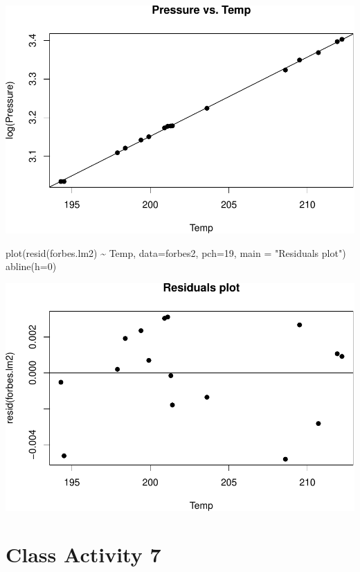 \documentclass[
]{book}
\newenvironment{Shaded}{\begin{snugshade}}{\end{snugshade}}
\newcommand{\AttributeTok}[1]{\textcolor[rgb]{0.77,0.63,0.00}{#1}}
\newcommand{\DecValTok}[1]{\textcolor[rgb]{0.00,0.00,0.81}{#1}}
\newcommand{\FunctionTok}[1]{\textcolor[rgb]{0.00,0.00,0.00}{#1}}
\newcommand{\NormalTok}[1]{#1}
\newcommand{\SpecialCharTok}[1]{\textcolor[rgb]{0.00,0.00,0.00}{#1}}
\newcommand{\StringTok}[1]{\textcolor[rgb]{0.31,0.60,0.02}{#1}}
\begin{document}
\includegraphics[width=1\linewidth]{Class_Activity_6_files/figure-latex/unnamed-chunk-33-1}

\begin{Shaded}
\begin{Highlighting}[]
\FunctionTok{plot}\NormalTok{(}\FunctionTok{resid}\NormalTok{(forbes.lm2) }\SpecialCharTok{\textasciitilde{}}\NormalTok{ Temp, }\AttributeTok{data=}\NormalTok{forbes2, }\AttributeTok{pch=}\DecValTok{19}\NormalTok{, }\AttributeTok{main =} \StringTok{"Residuals plot"}\NormalTok{)}
\FunctionTok{abline}\NormalTok{(}\AttributeTok{h=}\DecValTok{0}\NormalTok{)}
\end{Highlighting}
\end{Shaded}

\includegraphics[width=1\linewidth]{Class_Activity_6_files/figure-latex/unnamed-chunk-33-2}

\hypertarget{class-activity-7}{%
\chapter{Class Activity 7}\label{class-activity-7}}
\end{document}
